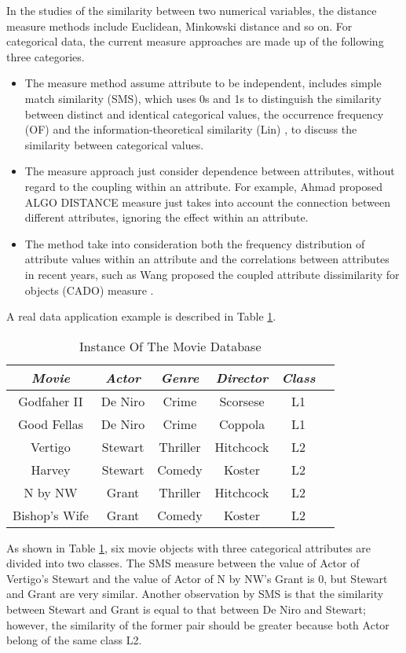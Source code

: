 \documentclass[review]{elsarticle}
\begin{document}
In the studies of the similarity between two numerical variables, the distance measure methods include Euclidean, Minkowski distance and so on. For categorical data, the current measure approaches are made up of the following three categories. 
\begin{itemize}
  \item The measure method assume attribute to be independent, includes simple match similarity (SMS), which uses 0s and 1s to distinguish the similarity between distinct and identical categorical values, the occurrence frequency (OF) \cite{BoriahS2008Comparative} and the information-theoretical similarity (Lin) \cite{BoriahS2008Comparative}, to discuss the similarity between categorical values.
  \item The measure approach just consider dependence between attributes, without regard to the coupling within an attribute. For example, Ahmad proposed ALGO DISTANCE measure \cite{Ahmad2007ALGO} just takes into account the connection between different attributes, ignoring the effect within an attribute. 
  \item The method take into consideration both the frequency distribution of attribute values within an attribute and the correlations between attributes in recent years, such as Wang proposed the coupled attribute dissimilarity for objects (CADO) measure \cite{WangC2015CADO}.
 \end{itemize}

A real data application example is described in Table \ref{tab:movie data}.
\begin{table}[!h]\tabcolsep=0.065in
\centering
\caption{Instance Of The Movie Database}
\small
\label{tab:movie data}
\begin{tabular}{|c|c|c|c|c|c|}
\hline
\emph{Movie}&\emph{Actor}&\emph{Genre}&\emph{Director}&\emph{Class} \\
\hline
Godfaher II & De Niro & Crime & Scorsese & L1 \\
\hline
Good Fellas & De Niro & Crime & Coppola & L1 \\
\hline
Vertigo & Stewart & Thriller & Hitchcock & L2 \\
\hline
Harvey & Stewart & Comedy & Koster & L2 \\
\hline
N by NW & Grant & Thriller & Hitchcock & L2 \\
\hline
Bishop's Wife & Grant & Comedy & Koster & L2 \\
\hline
\end{tabular}
\end{table}
As shown in Table \ref{tab:movie data}, six movie objects with three categorical attributes are divided into two classes. The SMS measure between the value of Actor of Vertigo's Stewart and the value of Actor of N by NW's Grant is 0, but Stewart and Grant are very similar. Another observation by SMS is that the similarity between Stewart and Grant is equal to that between De Niro and Stewart; however, the similarity of the former pair should be greater because both Actor belong of the same class L2.
\end{document}
